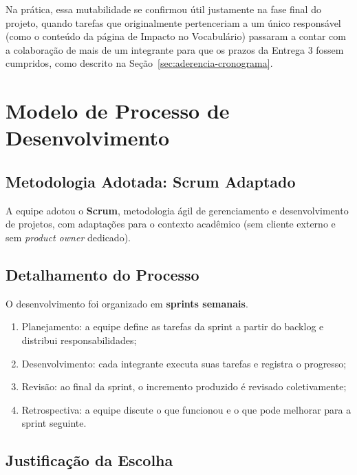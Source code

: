 \documentclass[12pt,a4paper]{article}
\begin{document}
Na prática, essa mutabilidade se confirmou útil justamente na fase final do projeto, quando
tarefas que originalmente pertenceriam a um único responsável (como o conteúdo da página de
Impacto no Vocabulário) passaram a contar com a colaboração de mais de um integrante para que os
prazos da Entrega 3 fossem cumpridos, como descrito na Seção~\ref{sec:aderencia-cronograma}.

\section{Modelo de Processo de Desenvolvimento}

\subsection{Metodologia Adotada: Scrum Adaptado}

A equipe adotou o \textbf{Scrum}, metodologia ágil de gerenciamento e desenvolvimento de
projetos, com adaptações para o contexto acadêmico (sem cliente externo e sem \textit{product
owner} dedicado).

\subsection{Detalhamento do Processo}

O desenvolvimento foi organizado em \textbf{sprints semanais}.

    \begin{enumerate}[leftmargin=*, label=\arabic*.]
        \item {Planejamento: a equipe define as tarefas da sprint a partir do backlog e
        distribui responsabilidades;}
        \item {Desenvolvimento: cada integrante executa suas tarefas e registra o progresso;}
        \item {Revisão: ao final da sprint, o incremento produzido é revisado coletivamente;}
        \item {Retrospectiva: a equipe discute o que funcionou e o que pode melhorar para a
        sprint seguinte.}
    \end{enumerate}

\subsection{Justificação da Escolha}
\end{document}
